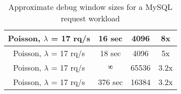 \begin{table}[ht]
\begin{centering}
\begin{tabular}{|c|c|c|c|}
Poisson, $\lambda$ = 17 rq/s                               & 16 sec                                                 & 4096                                                & 8x                        \\ \hline
Poisson, $\lambda$ = 17 rq/s                               & 18 sec                                                 & 4096                                                & 5x                      \\ \hline
Poisson, $\lambda$ = 17 rq/s                               & $\infinity$                                                    & 65536                                               & 3.2x \\ \hline
Poisson, $\lambda$ = 17 rq/s                               & 376 sec                                                & 16384                                               & 3.2x \\ \hline
\end{tabular}
\captionsetup{justification=centering}
\caption{Approximate debug window sizes for a MySQL request workload}
\label{table:timewindow}
\end{centering}
\end{table}
\fi